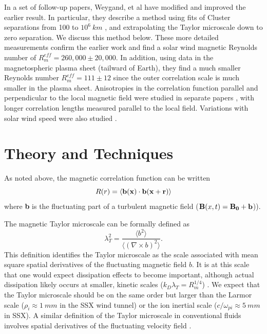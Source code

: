 \documentclass[aip,prl,amsmath,amssymb,reprint,superscriptaddress]{revtex4-1} %
\begin{document}
In a set of follow-up papers, Weygand, et al \cite{Weygand07,Weygand09,Weygand10,Weygand11} have modified and improved the earlier result.  In particular, they describe a method using fits of Cluster separations from 100 to $10^6~km$ \cite{Weygand07}, and extrapolating the Taylor microscale down to zero separation.  We discuss this method below.  These more detailed measurements confirm the earlier work  \cite{Matthaeus05} and find a solar wind magnetic Reynolds number of $R_m^{eff}  = 260,000 \pm 20,000$.  In addition, using data in the magnetospheric plasma sheet (tailward of Earth), they find a much smaller Reynolds number $R_m^{eff}  = 111 \pm 12$ since the outer correlation scale is much smaller in the plasma sheet.  Anisotropies in the correlation function parallel and perpendicular to the local magnetic field were studied in separate papers \cite{Weygand09,Weygand10}, with longer correlation lengths measured parallel to the local field.  Variations with solar wind speed were also studied \cite{Weygand11}.


\section{Theory and Techniques}

As noted above, the magnetic correlation function can be written
%
\begin{equation}
R(r) =  \langle {\bf b(x) \cdot b(x + r)} \rangle
\end{equation}
%
where {\bf b} is the fluctuating part of a turbulent magnetic field (${\bf B}(x, t) = {\bf B_0 + b}$)). 

The magnetic Taylor microscale can be formally defined as
%
\begin{equation}
\lambda_T^2 = \frac{\langle b^2 \rangle}{\langle (\nabla \times b)^2 \rangle}.
\label{eq:tayscale}
\end{equation}
%
This definition identifies the Taylor microscale as the scale associated with mean square spatial derivatives of the fluctuating magnetic field $b$.  It is at this scale that one would expect dissipation effects to become important, although actual dissipation likely occurs at smaller, kinetic scales ($k_D \lambda_T = R_m^{1/4}$) \cite{Matthaeus08}.  We expect that the Taylor microscale should be on the same order but larger than the Larmor scale ($\rho_i \approx 1~mm$ in the SSX wind tunnel) or the ion inertial scale ($c/\omega_{pi} \approx 5~mm$ in SSX).  A similar definition of the Taylor microscale in conventional fluids involves spatial derivatives of the fluctuating velocity field \cite{frisch95}.
\end{document}
